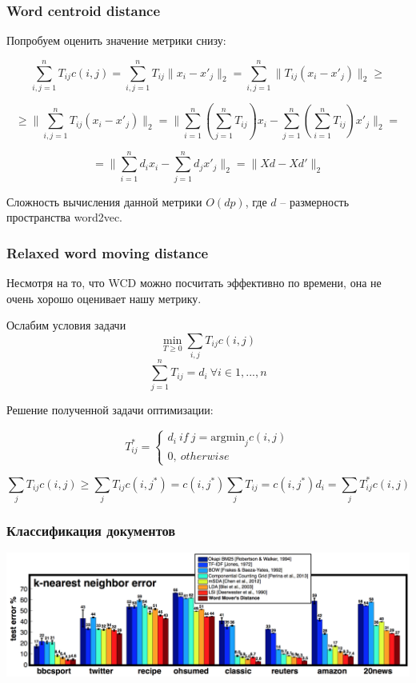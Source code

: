 \documentclass{beamer}
\begin{document}
\begin{frame}
\frametitle{Word centroid distance}

Попробуем оценить значение метрики снизу:


$$
\sum_{i,j=1}^n T_{ij} c(i,j) = \sum_{i,j=1}^n T_{ij} \|x_i - x'_j \|_2 = \sum_{i,j=1}^n \|T_{ij} (x_i - x'_j) \|_2 \geq
$$

$$
\geq \| \sum_{i,j=1}^n T_{ij} (x_i - x'_j) \|_2 = \| \sum_{i=1}^n \left(\sum_{j=1}^n T_{ij}\right) x_i - \sum_{j=1}^n \left(\sum_{i=1}^n T_{ij}\right) x
'_j \|_2 =
$$

$$
= \| \sum_{i=1}^n d_i  x_i - \sum_{j=1}^n d_j x'_j \|_2 = \| Xd - Xd'\|_2
$$

Сложность вычисления данной метрики $O(dp)$, где $d$ -- размерность пространства word2vec.

\end{frame}

\begin{frame}
\frametitle{Relaxed word moving distance}
Несмотря на то, что WCD можно посчитать эффективно по времени, она не очень хорошо оценивает нашу метрику.

Ослабим условия задачи
$$
\min_{T \geq 0} \sum_{i,j} T_{ij} c(i,j)
$$
$$
\sum_{j = 1}^n T_{ij} = d_i\ \forall i \in {1, ..., n}
$$

Решение полученной задачи оптимизации:

$$
T^*_{ij} =
\begin{cases}
       d_i\ if\ j = \text{argmin}_j c(i,j) \\
       0,\ otherwise
\end{cases}
$$

$$
\sum_{j} T_{ij} c(i,j) \geq \sum_{j} T_{ij} c(i,j^*)  =   c(i,j^*) \sum_{j} T_{ij} = c(i,j^*) d_i = \sum_{j} T^*_{ij} c(i,j)
$$

\end{frame}

\begin{frame}
\frametitle{Классификация документов}

\includegraphics[width=1 \textwidth]{3.png}

\end{frame}
\end{document}
